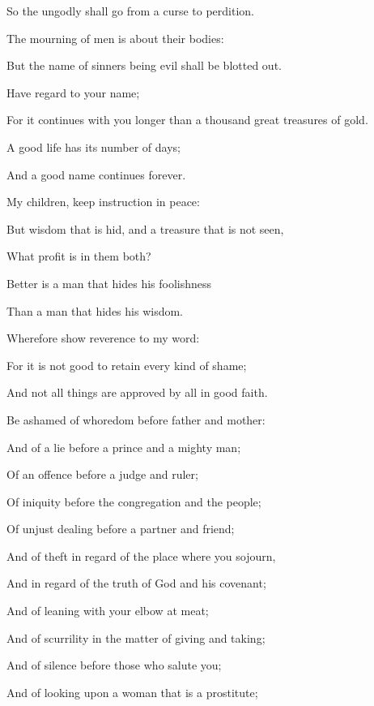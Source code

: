 {\par }{\Q So the ungodly shall go from a curse to perdition.
\par }{\Q {}The mourning of men is about their bodies:
\par }{\Q But the name of sinners being evil shall be blotted out.
\par }{\Q {}Have regard to your name;
\par }{\Q For it continues with you longer than a thousand great treasures of gold.
\par }{\Q {}A good life has its number of days;
\par }{\Q And a good name continues forever.
\par }{\BB \par }{\Q {}My children, keep instruction in peace:
\par }{\Q But wisdom that is hid, and a treasure that is not seen,
\par }{\Q What profit is in them both?
\par }{\Q {}Better is a man that hides his foolishness
\par }{\Q Than a man that hides his wisdom.
\par }{\Q {}Wherefore show reverence to my word:
\par }{\Q For it is not good to retain every kind of shame;
\par }{\Q And not all things are approved by all in good faith.
\par }{\BB \par }{\Q {}Be ashamed of whoredom before father and mother:
\par }{\Q And of a lie before a prince and a mighty man;
\par }{\Q {}Of an offence before a judge and ruler;
\par }{\Q Of iniquity before the congregation and the people;
\par }{\Q Of unjust dealing before a partner and friend;
\par }{\Q {}And of theft in regard of the place where you sojourn,
\par }{\Q And in regard of the truth of God and his covenant;
\par }{\Q And of leaning with your elbow at meat;
\par }{\Q And of scurrility in the matter of giving and taking;
\par }{\Q {}And of silence before those who salute you;
\par }{\Q And of looking upon a woman that is a prostitute;
}
